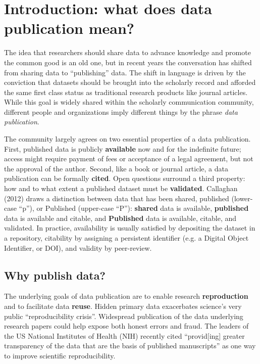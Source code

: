 \documentclass[10pt,twocolumn]{article}
\begin{document}
\section*{Introduction: what does data publication mean?}\label{introduction}

The idea that researchers should share data to advance knowledge and promote the common good is an old one, but in recent years the conversation has shifted from sharing data to ``publishing'' data.\cite{costello_motivating_2009,smith_data_2009,lawrence_data_2011}
The shift in language is driven by the conviction that datasets should be brought into the scholarly record and afforded the same first class status as traditional research products like journal articles.\cite{sarah_callaghan_making_2012}
While this goal is widely shared within the scholarly communication community, different people and organizations imply different things by the phrase \emph{data publication}. %

The community largely agrees on two essential properties of a data publication\cite{smith_data_2009,sarah_callaghan_making_2012}.
First, published data is publicly \textbf{available} now and for the indefinite future; access might require payment of fees or acceptance of a legal agreement, but not the approval of the author.
Second, like a book or journal article, a data publication can be formally \textbf{cited}.
Open questions surround a third property: how and to what extent a published dataset must be \textbf{validated}.
Callaghan (2012)\cite{sarah_callaghan_making_2012} draws a distinction between data that has been shared, published (lower-case “p”), or Published (upper-case “P”): \textbf{shared} data is available, \textbf{published} data is available and citable, and \textbf{Published} data is available, citable, and validated.
In practice, availability is usually satisfied by depositing the dataset in a repository, citability by assigning a persistent identifier (e.g. a Digital Object Identifier, or DOI), and validity by peer-review.

\subsection*{Why publish data?}\label{why-publish-data}

The underlying goals of data publication are to enable research \textbf{reproduction} and to facilitate data \textbf{reuse}.
Hidden primary data exacerbates science's very public ``reproducibility crisis''\cite{mobley_survey_2013,pashler_is_2012,zimmer_rise_2012,hiltzik_science_2013,begley_drug_2012}.
Widespread publication of the data underlying research papers could help expose both honest errors and fraud\cite{drew_lost_2013}.
The leaders of the US National Institutes of Health (NIH) recently cited ``provid[ing] greater transparency of the data that are the basis of published manuscripts'' as one way to improve scientific reproducibility\cite{collins_nih_2014}.
\end{document}
